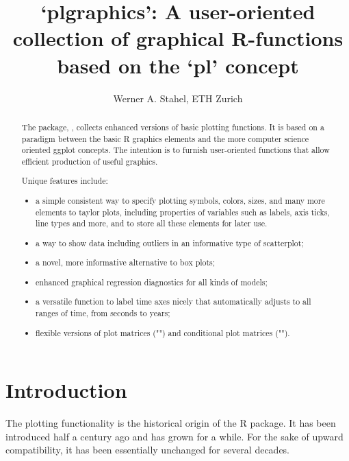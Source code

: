 \documentclass[11pt]{article}\usepackage[]{graphicx}\usepackage[]{color}
\begin{document}
\baselineskip 15pt
\parskip 10pt

\title{\vspace*{-10mm}
`plgraphics': A user-oriented collection of graphical R-functions based on
 the `pl' concept}
\author{Werner A. Stahel, ETH Zurich}
\maketitle

\begin{abstract}\noindent
The package, , collects enhanced versions of basic plotting
functions. It is based on a paradigm between the basic R graphics elements
and the more computer science oriented ggplot concepts.
The intention is to furnish user-oriented functions that allow efficient
production of useful graphics.

Unique features include: 
\begin{itemize}
\item
a simple consistent way to specify plotting symbols, colors, sizes, and many more elements to taylor plots,
including properties of variables such as labels, axis ticks, line types and more, and to store all these elements for later use.
\item
a way to show data including outliers in an informative type of scatterplot;
\item
a novel, more informative alternative to box plots;
\item
enhanced graphical regression diagnostics for all kinds of models;
\item
a versatile function to label time axes nicely that automatically adjusts to all ranges of time, from seconds to years;
\item
flexible versions of plot matrices ("") and conditional plot matrices ("").
\end{itemize}
\end{abstract}



\pagebreak

\tableofcontents

\pagebreak
\section{Introduction}

The plotting functionality is the historical origin of the R package.
It has been introduced half a century ago and has grown for a while.
For the sake of upward compatibility, it has been essentially unchanged for
several decades. 
\end{document}

